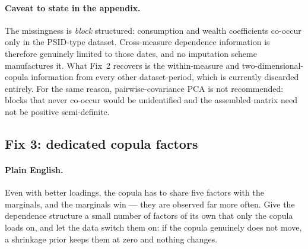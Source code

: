 \documentclass[11pt]{article}
\begin{document}
\paragraph{Caveat to state in the appendix.} The missingness is \emph{block}
structured: consumption and wealth coefficients co-occur only in the
PSID-type dataset. Cross-measure dependence information is therefore genuinely
limited to those dates, and no imputation scheme manufactures it. What Fix~2
recovers is the within-measure and two-dimensional-copula information from every
other dataset-period, which is currently discarded entirely. For the same
reason, pairwise-covariance PCA is not recommended: blocks that never co-occur
would be unidentified and the assembled matrix need not be positive
semi-definite.

\subsection{Fix 3: dedicated copula factors}

\paragraph{Plain English.} Even with better loadings, the copula has to share
five factors with the marginals, and the marginals win --- they are observed far
more often. Give the dependence structure a small number of factors of its own
that only the copula loads on, and let the data switch them on: if the copula
genuinely does not move, a shrinkage prior keeps them at zero and nothing
changes.
\end{document}
